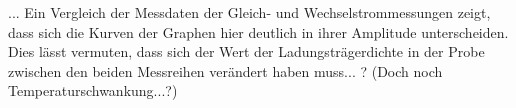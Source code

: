 



... Ein Vergleich der Messdaten der Gleich- und Wechselstrommessungen zeigt, dass sich die Kurven der Graphen hier deutlich in ihrer Amplitude unterscheiden. Dies lässt vermuten, dass sich der Wert der Ladungsträgerdichte in der Probe zwischen den beiden Messreihen verändert haben muss... ? (Doch noch Temperaturschwankung...?)


